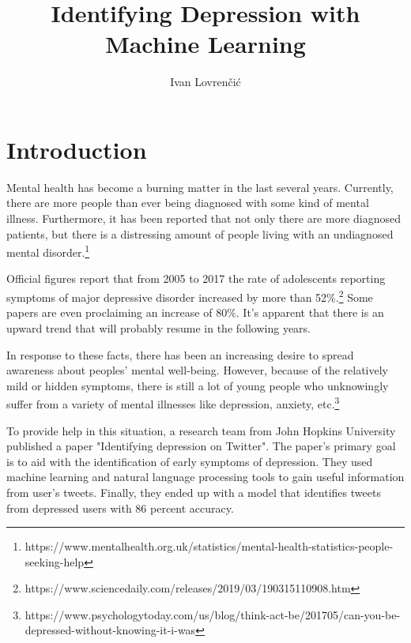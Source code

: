 \documentclass[times, utf8, seminar]{fer}
\begin{document}
\title{Identifying Depression with Machine Learning}

\author{Ivan Lovrenčić}


\maketitle

\tableofcontents

\chapter{Introduction}

Mental health has become a burning matter in the last several years. Currently, there are more people than ever being diagnosed with some kind of mental illness. Furthermore, it has been reported that not only there are more diagnosed patients, but there is a distressing amount of people living with an undiagnosed mental disorder.\footnote{https://www.mentalhealth.org.uk/statistics/mental-health-statistics-people-seeking-help}

Official figures report that from 2005 to 2017 the rate of adolescents reporting symptoms of major depressive disorder increased by more than 52\%.\footnote{https://www.sciencedaily.com/releases/2019/03/190315110908.htm} Some papers are even proclaiming an increase of 80\%. It's apparent that there is an upward trend that will probably resume in the following years. 

In response to these facts, there has been an increasing desire to spread awareness about peoples' mental well-being. However, because of the relatively mild or hidden symptoms, there is still a lot of young people who unknowingly suffer from a variety of mental illnesses like depression, anxiety, etc.\footnote{https://www.psychologytoday.com/us/blog/think-act-be/201705/can-you-be-depressed-without-knowing-it-i-was} 

To provide help in this situation, a research team from John Hopkins University published a paper "Identifying depression on Twitter". The paper's primary goal is to aid with the identification of early symptoms of depression. They used machine learning and natural language processing tools to gain useful information from user's tweets. Finally, they ended up with a model that identifies tweets from depressed users with 86 percent accuracy. 
\end{document}
